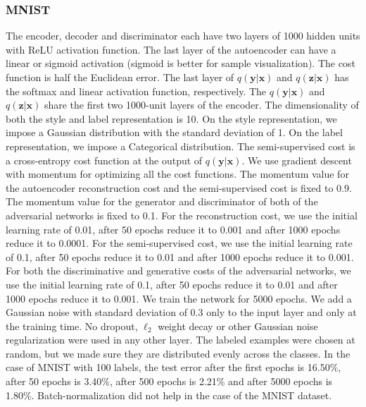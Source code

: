 \documentclass{article}
\begin{document}
\begin{appendices}
\subsubsection{MNIST}\label{mnist-semi}
The encoder, decoder and discriminator each have two layers of 1000 hidden units with ReLU activation function. The last layer of the autoencoder can have a linear or sigmoid activation (sigmoid is better for sample visualization). The cost function is half the Euclidean error. The last layer of $q(\mathbf{y}|\mathbf{x})$ and $q(\mathbf{z}|\mathbf{x})$ has the softmax and linear activation function, respectively. The $q(\mathbf{y}|\mathbf{x})$ and $q(\mathbf{z}|\mathbf{x})$ share the first two 1000-unit layers of the encoder. The dimensionality of both the style and label representation is 10. On the style representation, we impose a Gaussian distribution with the standard deviation of 1. On the label representation, we impose a Categorical distribution. The semi-supervised cost is a cross-entropy cost function at the output of $q(\mathbf{y}|\mathbf{x})$. We use gradient descent with momentum for optimizing all the cost functions. The momentum value for the autoencoder reconstruction cost and the semi-supervised cost is fixed to 0.9. The momentum value for the generator and discriminator of both of the adversarial networks is fixed to 0.1. For the reconstruction cost, we use the initial learning rate of 0.01, after 50 epochs reduce it to 0.001 and after 1000 epochs reduce it to 0.0001. For the semi-supervised cost, we use the initial learning rate of 0.1, after 50 epochs reduce it to 0.01 and after 1000 epochs reduce it to 0.001. For both the discriminative and generative costs of the adversarial networks, we use the initial learning rate of 0.1, after 50 epochs reduce it to 0.01 and after 1000 epochs reduce it to 0.001. We train the network for 5000 epochs. We add a Gaussian noise with standard deviation of 0.3 only to the input layer and only at the training time. No dropout, $\ell_2$ weight decay or other Gaussian noise regularization were used in any other layer. The labeled examples were chosen at random, but we made sure they are distributed evenly across the classes. In the case of MNIST with 100 labels, the test error after the first epochs is 16.50\%, after 50 epochs is 3.40\%, after 500 epochs is 2.21\% and after 5000 epochs is 1.80\%. Batch-normalization \citep{batch} did not help in the case of the MNIST dataset.


\end{appendices}
\end{document}
